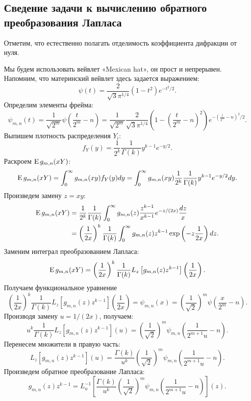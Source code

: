 \documentclass[../paper.tex]{subfiles}
\begin{document}
\subsection{Сведение задачи к вычислению обратного преобразования Лапласа}
Отметим, что естественно полагать отделимость коэффициента дифракции от нуля.

Мы будем использовать вейвлет «Mexican hat», он прост и непрерывен. Напомним, что материнский вейвлет здесь задается выражением:
\[
    \psi(t) = \frac{2}{\sqrt{3} \pi^{1 / 4}} (1-t^2)e^{-t^2 / 2}
.\]
Определим элементы фрейма:
\[
    \psi_{m,n}(t) = 
    \frac{1}{\sqrt{2^m}} \psi\left( \frac{t}{2^m}-n \right) =
    \frac{1}{\sqrt{2^m} }\frac{2}{\sqrt{3} \pi^{1 / 4}} \left(1-\left( \frac{t}{2^m} - n \right)^2 \right) e^{-\left( \frac{t}{2^m} - n \right)^2 / 2}
.\]
Выпишем плотность распределения $Y_i$:
\[
	f_Y(y) = \frac{1}{2^k} \frac{1}{\Gamma(k)} y^{k-1} e^{-y / 2}
.\]
Раскроем $\operatorname{E} g_{m,n}(xY)$:
\[
	\operatorname{E} g_{m,n}(xY)
	= \int_0^\infty g_{m,n}(xy) f_Y(y) dy
	= \int_0^\infty g_{m,n}(xy) \frac{1}{2^k} \frac{1}{\Gamma(k)} y^{k-1} e^{-y / 2} dy
.\]
Произведем замену $z = xy$:
\begin{align*}
	\operatorname{E} g_{m,n}(xY)
	&= \frac{1}{2^k}\frac{1}{\Gamma(k)} \int_0^\infty g_{m,n}(z) \frac{z^{k-1}}{x^{k-1}} e^{-z/(2x)} \frac{dz}{x}
	\\&= \left(\frac{1}{2x}\right)^k \frac{1}{\Gamma(k)} \int_0^\infty g_{m,n}(z) z^{k-1} \exp\left(-z \frac{1}{2x}\right) dz
.\end{align*}
%
Заменим интеграл преобразованием Лапласа:
\[
	\operatorname{E} g_{m,n}(xY)
	= \left( \frac{1}{2x} \right)^k \frac{1}{\Gamma(k)} L_z \left[g_{m,n}(z) z^{k-1}\right] \left( \frac{1}{2x} \right)
.\]
%
Получаем функциональное уравнение
\[
	\left( \frac{1}{2x} \right)^k \frac{1}{\Gamma(k)} L_z \left[g_{m,n}(z) z^{k-1}\right] \left( \frac{1}{2x} \right)
	= \psi_{m,n}(x)
	= \left( \frac{1}{\sqrt{2} } \right)^m \psi \left( \frac{x}{2^m} - n \right) 
.\]
%
Производя замену $u = 1/(2x)$, получаем:
\[
    u^k \frac{1}{\Gamma(k)} L_z \left[g_{m,n}(z) z^{k-1}\right] \left( u \right)
    = \left( \frac{1}{\sqrt{2} } \right)^m \psi_{m,n} \left( \frac{1}{2^{m+1} u} - n \right) 
.\]
%
Перенесем множители в правую часть:
\[
    L_z \left[g_{m,n}(z) z^{k-1}\right] \left( u \right)
    = \frac{\Gamma(k)}{u^k} \left( \frac{1}{\sqrt{2} } \right)^m \psi_{m,n} \left( \frac{1}{2^{m+1} u} - n \right)
.\]
%
Произведем обратное преобразование Лапласа:
\[
    g_{m,n}(z) z^{k-1}
    = L^{-1}_u \left[ \frac{\Gamma(k)}{u^k} \left( \frac{1}{\sqrt{2} } \right)^m \psi_{m,n} \left( \frac{1}{2^{m+1} u} - n \right) \right] (z)
.\]
\end{document}
